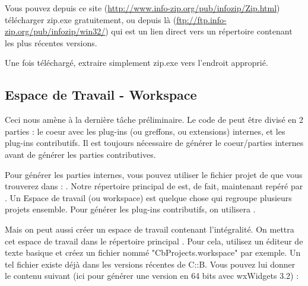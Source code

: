 Vous pouvez depuis ce site (\url{http://www.info-zip.org/pub/infozip/Zip.html}) télécharger zip.exe gratuitement, ou depuis là (\url{ftp://ftp.info-zip.org/pub/infozip/win32/}) qui est un lien direct vers un répertoire contenant les plus récentes versions.

Une fois téléchargé, extraire simplement zip.exe vers l'endroit approprié.

\subsection{Espace de Travail - Workspace}
Ceci nous amène à la dernière tâche préliminaire. Le code de \codeblocks peut être divisé en 2 parties : le coeur avec les plug-ins (ou greffons, ou extensions) internes, et les plug-ins contributifs. Il est toujours nécessaire de générer le coeur/parties internes avant de générer les parties contributives.

Pour générer les parties internes, vous pouvez utiliser le fichier projet de \codeblocks que vous trouverez dans : . Notre répertoire principal de \codeblocks est, de fait, maintenant repéré par . Un Espace de travail (ou workspace) est quelque chose qui regroupe plusieurs projets ensemble. Pour générer les plug-ins contributifs, on utilisera .

Mais on peut aussi créer un espace de travail contenant l'intégralité. On mettra cet espace de travail dans le répertoire principal . Pour cela, utilisez un éditeur de texte basique et créez un fichier nommé "CbProjects.workspace" par exemple. Un tel fichier existe déjà dans les versions récentes de C::B. Vous pouvez lui donner le contenu suivant (ici pour générer une version en 64 bits avec wxWidgets 3.2) : 


